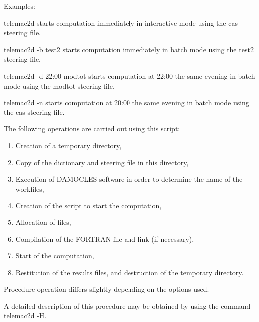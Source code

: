  Examples:

 telemac2d starts computation immediately in interactive mode using the cas steering file.

 telemac2d -b test2 starts computation immediately in batch mode using the test2 steering file.

 telemac2d -d 22:00 modtot starts computation at 22:00 the same evening in batch mode using the modtot steering file.

 telemac2d -n starts computation at 20:00 the same evening in batch mode using the cas steering file.



 The following operations are carried out using this script:

\begin{enumerate}
\item  Creation of a temporary directory,

\item  Copy of the dictionary and steering file in this directory,

\item  Execution of DAMOCLES software in order to determine the name of the workfiles,

\item  Creation of the script to start the computation,

\item  Allocation of files,

\item  Compilation of the FORTRAN file and link (if necessary),

\item  Start of the computation,

\item  Restitution of the results files, and destruction of the temporary directory.
\end{enumerate}



 Procedure operation differs slightly depending on the options used.

 A detailed description of this procedure may be obtained by using the command telemac2d -H.




 
